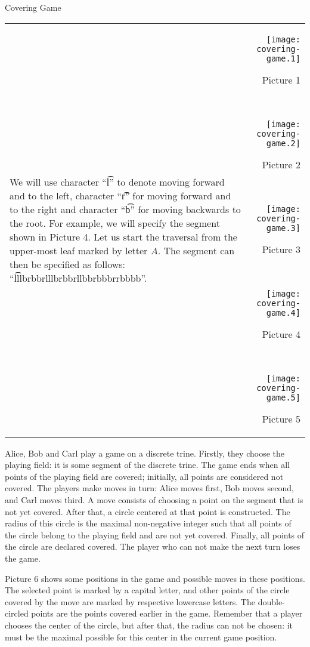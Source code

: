 \begin{problem}{Covering Game}
\begin{tabular}{lr}
\begin{minipage}{0.70\thelinewidth}
We will use character ``\t{l}'' to denote moving forward and to the left,
character ``\t{r}'' for moving forward and to the right
and character ``\t{b}'' for moving backwards to the root.
For example, we will specify the segment shown in Picture 4.
Let us start the traversal from the upper-most leaf marked by letter $A$.
The segment can then be specified as follows:
``\t{lllbrbbrlllbrbbrllbbrbbbrrbbbb}''.
\end{minipage}
&
\begin{minipage}{0.27\thelinewidth}
\begin{center}
\vskip -70pt

\texttt{[image: covering-game.1]}

Picture 1

~

\texttt{[image: covering-game.2]}

Picture 2

~

\texttt{[image: covering-game.3]}

Picture 3

~

\texttt{[image: covering-game.4]}

Picture 4

~

\texttt{[image: covering-game.5]}

Picture 5
\end{center}
\end{minipage}
\end{tabular}

\newpage

Alice, Bob and Carl play a game on a discrete trine.
Firstly, they choose the playing field: it is some segment
of the discrete trine.
The game ends when all points of the playing field are covered;
initially, all points are considered not covered.
The players make moves in turn:
Alice moves first, Bob moves second, and Carl moves third.
A move consists of choosing a point on the segment that is not yet covered.
After that, a circle centered at that point is constructed.
The radius of this circle is the maximal non-negative integer such that
all points of the circle belong to the playing field and are not yet covered.
Finally, all points of the circle are declared covered.
The player who can not make the next turn loses the game.

Picture 6 shows some positions in the game and possible moves
in these positions.
The selected point is marked by a capital letter, and other points
of the circle covered by the move are marked by respective lowercase letters.
The double-circled points are the points covered earlier in the game.
Remember that a player chooses the center of the circle, but after that,
the radius can not be chosen: it must be the maximal possible for this center
in the current game position.


\end{problem}

